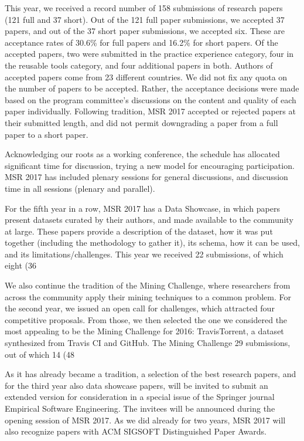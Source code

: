 \documentclass[a4paper]{report}
\begin{document}
This year, we received a record number of 158 submissions of research papers (121 full and 37 short). Out of the 121 full paper submissions, we accepted 37 papers, and out of the 37 short paper submissions, we accepted six. These are acceptance rates of 30.6\% for full papers and 16.2\% for short papers. Of the accepted papers, two were submitted in the practice experience category, four in the reusable tools category, and four additional papers in both. Authors of accepted papers come from 23 different countries. We did not fix any quota on the number of papers to be accepted. Rather, the acceptance decisions were made based on the program committee's discussions on the content and quality of each paper individually. Following tradition, MSR 2017 accepted or rejected papers at their submitted length, and did not permit downgrading a paper from a full paper to a short paper. 

Acknowledging our roots as a working conference, the schedule has allocated significant time for discussion, trying a new model for encouraging participation. MSR 2017 has included plenary sessions for general discussions, and discussion time in all sessions (plenary and parallel). 

For the fifth year in a row, MSR 2017 has a Data Showcase, in which papers present datasets curated by their authors, and made available to the community at large. These papers provide a description of the dataset, how it was put together (including the methodology to gather it), its schema, how it can be used, and its limitations/challenges. This year we received 22 submissions, of which eight (36%

We also continue the tradition of the Mining Challenge, where researchers from across the community apply their mining techniques to a common problem. For the second year, we issued an open call for challenges, which attracted four competitive proposals. From those, we then selected the one we considered the most appealing to be the Mining Challenge for 2016: TravisTorrent, a dataset synthesized from Travis CI and GitHub. The Mining Challenge 29 submissions, out of which 14 (48%

As it has already became a tradition, a selection of the best research papers, and for the third year also data showcase papers, will be invited to submit an extended version for consideration in a special issue of the Springer journal Empirical Software Engineering. The invitees will be announced during the opening session of MSR 2017. As we did already for two years, MSR 2017 will also recognize papers with ACM SIGSOFT Distinguished Paper Awards.
\end{document}

